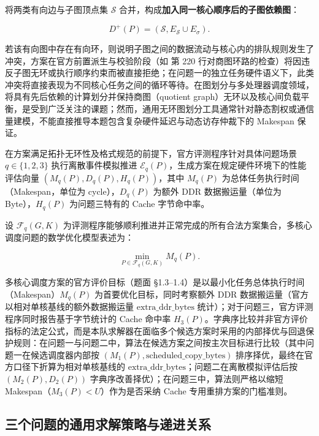 \documentclass[anonymous,notoc]{gmcm2026}
\begin{document}
将两类有向边与子图顶点集 \(\mathcal{S}\) 合并，构成\textbf{加入同一核心顺序后的子图依赖图}：

\begin{equation}
D^+(P) = (\mathcal{S}, E_{\mathcal{S}} \cup E_\sigma).
\end{equation}

若该有向图中存在有向环，则说明子图之间的数据流动与核心内的排队规则发生了冲突，方案在官方前置派生与校验阶段（如 \texttt{} 第 220 行对商图环路的检查）将因违反子图无环或执行顺序约束而被直接拒绝；在问题一的独立任务硬件语义下，此类冲突将直接表现为不同核心任务之间的循环等待。在图划分与多处理器调度领域，将具有先后依赖的计算划分并保持商图（quotient graph）无环以及核心间负载平衡，是受到广泛关注的课题\cite{ref6}；然而，通用无环图划分工具通常针对静态割权或通信量建模，不能直接推导本题包含复杂硬件延迟与动态访存仲裁下的 Makespan 保证。

在方案满足拓扑无环性及格式规范的前提下，官方评测程序针对具体问题场景 \(q \in \{1, 2, 3\}\) 执行离散事件模拟推进 \(\mathcal{E}_q(P)\)，生成方案在规定硬件环境下的性能评估向量 \((M_q(P), D_q(P), H_q(P))\)，其中 \(M_q(P)\) 为总体任务执行时间（Makespan，单位为 cycle），\(D_q(P)\) 为额外 DDR 数据搬运量（单位为 Byte），\(H_q(P)\) 为问题三特有的 Cache 字节命中率。

设 \(\mathcal{F}_q(G, K)\) 为评测程序能够顺利推进并正常完成的所有合法方案集合，多核心调度问题的数学优化模型表述为：

\begin{equation}
\min_{P \in \mathcal{F}_q(G, K)} M_q(P).
\end{equation}

多核心调度方案的官方评价目标（题面 §1.3--1.4）是以最小化任务总体执行时间（Makespan）\(M_q(P)\) 为首要优化目标，同时考察额外 DDR 数据搬运量（官方以相对单核基线的额外数据搬运量 \(\text{extra\_ddr\_bytes}\) 统计）；对于问题三，官方评测程序同时报告基于字节统计的 Cache 命中率 \(H_3(P)\)。字典序比较并非官方评价指标的法定公式，而是本队求解器在面临多个候选方案时采用的内部择优与回退保护规则：在问题一与问题二中，算法在候选方案之间按主次目标进行比较（其中问题一在候选调度器内部按 \((M_1(P), \text{scheduled\_copy\_bytes})\) 排序择优，最终在官方口径下折算为相对单核基线的 \(\text{extra\_ddr\_bytes}\)；问题二在离散模拟评估后按 \((M_2(P), D_2(P))\) 字典序改善择优）；在问题三中，算法则严格以缩短 Makespan（\(M_3(P) < U\)）作为是否采纳 Cache 专用重排方案的门槛准则。

\subsection{三个问题的通用求解策略与递进关系}
\end{document}
